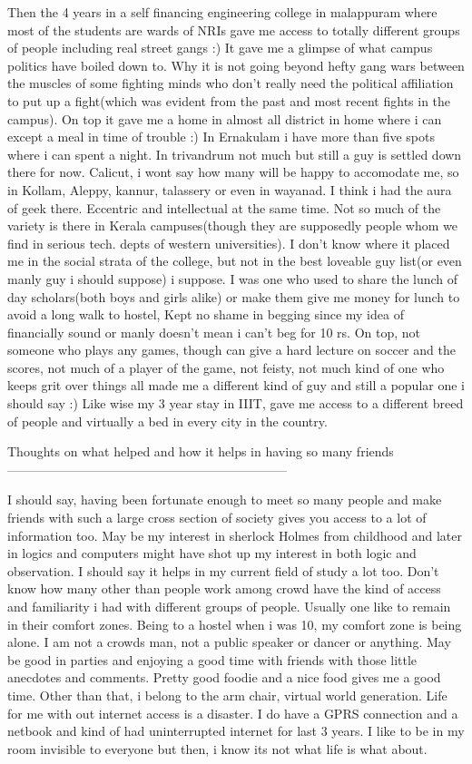 Then the 4 years in a self financing engineering college in malappuram where most of the students are wards of NRIs gave me access to totally different groups of people including real street gangs :) It gave me a glimpse of what campus politics have boiled down to. Why it is not going beyond hefty gang wars between the muscles of some fighting minds who don't really need the political affiliation to put up a fight(which was evident from the past and most recent fights in the campus). On top it gave me a home in almost all district in home where i can except a meal in time of trouble :) In Ernakulam i have more than five spots where i can spent a night. In trivandrum not much but still a guy is settled down there for now. Calicut, i wont say how many will be happy to accomodate me, so in Kollam, Aleppy, kannur, talassery or even in wayanad. I think i had the aura of geek there. Eccentric and intellectual at the same time. Not so much of the variety is there in Kerala campuses(though they are supposedly people whom we find in serious tech. depts of western universities). I don't know where it placed me in the social strata of the college, but not in the best loveable guy list(or even manly guy i should suppose) i suppose. I was one who used to share the lunch of day scholars(both boys and girls alike) or make them give me money for lunch to avoid a long walk to hostel, Kept no shame in begging since my idea of financially sound or manly doesn't mean i can't beg for 10 rs. On top, not someone who plays any games, though can give a hard lecture on soccer and the scores, not much of a player of the game, not feisty, not much kind of one who keeps grit over things all made me a different kind of guy and still a popular one i should say :) Like wise my 3 year stay in IIIT, gave me access to a different breed of people and virtually a bed in every city in the country.

Thoughts on what helped and how it helps in having so many friends
------------------------------------------------------------------

I should say, having been fortunate enough to meet so many people and make friends with such a large cross section of society gives you access to a lot of information too. May be my interest in sherlock Holmes from childhood and later in logics and computers might have shot up my interest in both logic and observation. I should say it helps in my current field of study a lot too. Don't know how many other than people work among crowd have the kind of access and familiarity i had with different groups of people. Usually one like to remain in their comfort zones. Being to a hostel when i was 10, my comfort zone is being alone. I am not a crowds man, not a public speaker or dancer or anything. May be good in parties and enjoying a good time with friends with those little anecdotes and comments. Pretty good foodie and a nice food gives me a good time. Other than that, i belong to the arm chair, virtual world generation. Life for me with out internet access is a disaster. I do have a GPRS connection and a netbook and kind of had uninterrupted internet for last 3 years. I like to be in my room invisible to everyone but then, i know its not what life is what about. 

